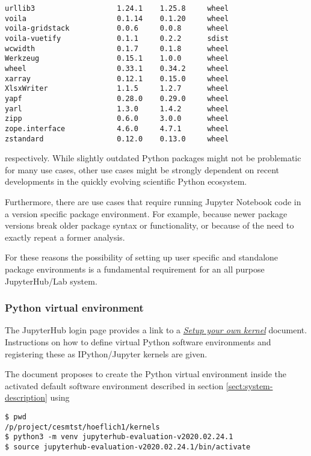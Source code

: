 \documentclass[11pt,a4paper]{article}
\begin{document}
\begin{verbatim}
urllib3                   1.24.1    1.25.8     wheel
voila                     0.1.14    0.1.20     wheel
voila-gridstack           0.0.6     0.0.8      wheel
voila-vuetify             0.1.1     0.2.2      sdist
wcwidth                   0.1.7     0.1.8      wheel
Werkzeug                  0.15.1    1.0.0      wheel
wheel                     0.33.1    0.34.2     wheel
xarray                    0.12.1    0.15.0     wheel
XlsxWriter                1.1.5     1.2.7      wheel
yapf                      0.28.0    0.29.0     wheel
yarl                      1.3.0     1.4.2      wheel
zipp                      0.6.0     3.0.0      wheel
zope.interface            4.6.0     4.7.1      wheel
zstandard                 0.12.0    0.13.0     wheel
\end{verbatim}

respectively.
While slightly outdated Python packages might not be problematic for many use cases, other use cases might be strongly dependent on recent developments in the quickly evolving scientific Python ecosystem.

Furthermore, there are use cases that require running Jupyter Notebook code in a version specific package environment.
For example, because newer package versions break older package syntax or functionality, or because of the need to exactly repeat a former analysis.

For these reasons the possibility of setting up user specific and standalone package environments is a fundamental requirement for an all purpose JupyterHub/Lab system.

\subsubsection{Python virtual environment}
\label{sect:python-kernel:virtual-environment}

The JupyterHub login page provides a link to a \href{https://jupyter-jsc.fz-juelich.de/hub/static/files/kernel.html}{\emph{Setup your own kernel}} document.
Instructions on how to define virtual Python software environments and registering these as IPython/Jupyter kernels are given.

The document proposes to create the Python virtual environment inside the activated default software environment described in section \ref{sect:system-description} using

\begin{verbatim}
$ pwd
/p/project/cesmtst/hoeflich1/kernels
$ python3 -m venv jupyterhub-evaluation-v2020.02.24.1
$ source jupyterhub-evaluation-v2020.02.24.1/bin/activate
\end{verbatim}
\end{document}
